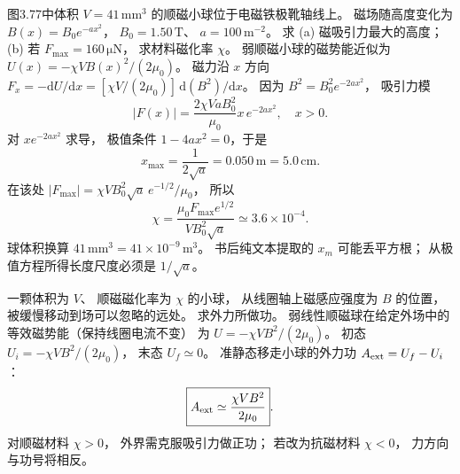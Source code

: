 图3.77中体积
$V=41\,\mathrm{mm^3}$
的顺磁小球位于电磁铁极靴轴线上。
磁场随高度变化为
$B(x)=B_0e^{-a x^2}$，
$B_0=1.50\,\mathrm T$、
$a=100\,\mathrm{m^{-2}}$。
求 (a) 磁吸引力最大的高度；
(b) 若 $F_{\max}=160\,\mathrm{\mu N}$，
求材料磁化率 $\chi$。
\exsolution
弱顺磁小球的磁势能近似为
$U(x)=-\chi VB(x)^2/(2\mu_0)$。
磁力沿 $x$ 方向
$F_x=-\mathrm dU/\mathrm dx
=[\chi V/(2\mu_0)]\,\mathrm d(B^2)/\mathrm dx$。
因为
$B^2=B_0^2e^{-2ax^2}$，
吸引力模
\[
|F(x)|=\frac{2\chi Va B_0^2}{\mu_0}
x\,e^{-2ax^2},\quad x>0.
\]
对 $x e^{-2ax^2}$ 求导，
极值条件
$1-4ax^2=0$，于是
\[
\boxed{x_{\max}=\frac1{2\sqrt a}
=0.050\,\mathrm m=5.0\,\mathrm{cm}}.
\]
在该处
$|F_{\max}|=
\chi VB_0^2\sqrt a\,e^{-1/2}/\mu_0$，
所以
\[
\boxed{\chi=
\frac{\mu_0F_{\max}e^{1/2}}
{VB_0^2\sqrt a}
\simeq3.6\times10^{-4}}.
\]
\excheck 球体积换算
$41\,\mathrm{mm^3}=41\times10^{-9}\,\mathrm{m^3}$。
书后纯文本提取的 $x_m$ 可能丢平方根；
从极值方程所得长度尺度必须是 $1/\sqrt a$。

一颗体积为 $V$、
顺磁磁化率为 $\chi$ 的小球，
从线圈轴上磁感应强度为 $B$ 的位置，
被缓慢移动到场可以忽略的远处。
求外力所做功。
\exsolution
弱线性顺磁球在给定外场中的
等效磁势能（保持线圈电流不变）
为
$U=-\chi VB^2/(2\mu_0)$。
初态
$U_i=-\chi VB^2/(2\mu_0)$，
末态
$U_f\simeq0$。
准静态移走小球的外力功
$A_{\rm ext}=U_f-U_i$：
\[
\boxed{A_{\rm ext}\simeq
\frac{\chi VB^2}{2\mu_0}}.
\]
\excheck 对顺磁材料 $\chi>0$，
外界需克服吸引力做正功；
若改为抗磁材料 $\chi<0$，
力方向与功号将相反。
